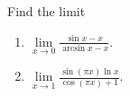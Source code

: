 Find the limit
\begin{multicols}{2}
\begin{enumerate}
\item $\displaystyle \lim\limits_{x\to 0} \frac{\sin x-x }{\arcsin x-x } $.
\item \label{problemLHospital (sin (pi x) ln x )/ (cos pi x +1)}  $\displaystyle \lim\limits_{x\to 1} \frac{\sin \left(\pi x\right)\ln x }{\cos(\pi x)+1 } $.
\end{enumerate}
\end{multicols}